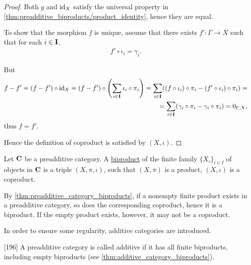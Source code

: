 \begin{proof}
  Both $g$ and $\operatorname{id}_X$ satisfy the universal property in \cref{thm:preadditive_biproducts/product_identity}, hence they are equal.

  To show that the morphism $f$ is unique, assume that there exists $f': \Gamma \to X$ such that for each $i \in \operatorname{\mathbf{I}}$,
  \begin{align*}
    f' \circ \iota_i = \gamma_i.
  \end{align*}

  But
  \begin{align*}
    f - f'
    =
    (f - f') \circ \operatorname{id}_X
    =
    (f - f') \circ \left( \sum_{i \in \operatorname{\mathbf{I}}} \iota_i \circ \pi_i \right)
    =
    \sum_{i \in \operatorname{\mathbf{I}}} ((f \circ \iota_i) \circ \pi_i - (f' \circ \iota_i) \circ \pi_i)
    = \\ =
    \sum_{i \in \operatorname{\mathbf{I}}} (\gamma_i \circ \pi_i - \gamma_i \circ \pi_i)
    =
    0_{\Gamma,X},
  \end{align*}
  thus $f = f'$.

  Hence the definition of coproduct is satisfied by $(X, \iota)$.
\end{proof}

\begin{definition}\label{def:categorical_biproduct}
  Let $\operatorname{\mathbf{C}}$ be a preadditive category. A \uline{biproduct} of the finite family $\{ X_i \}_{i \in I}$ of objects in $\operatorname{\mathbf{C}}$ is a triple $(X, \pi, \iota)$, such that $(X, \pi)$ is a product, $(X, \iota)$ is a coproduct.
\end{definition}

\begin{note}\label{note:preadditive_category_biproducts}
  By \cref{thm:preadditive_category_biproducts}, if a nonempty finite product exists in a preadditive category, so does the corresponding coproduct, hence it is a biproduct. If the empty product exists, however, it may not be a coproduct.

  In order to ensure some regularity, additive categories are introduced.
\end{note}

\begin{definition}\label{def:additive_category}\cite{MacLane1994}[196]
  A preadditive category is called additive if it has all finite biproducts, including empty biproducts (see \cref{thm:additive_category_biproducts}).
\end{definition}

